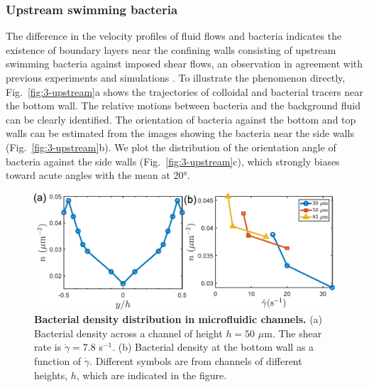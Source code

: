 \subsubsection{Upstream swimming bacteria}
The difference in the velocity profiles of fluid flows and bacteria indicates the existence of boundary layers near the confining walls consisting of upstream swimming bacteria against imposed shear flows, an observation in agreement with previous experiments \cite{Hill2007, Kaya2012} and simulations \cite{Costanzo2012, Chilukuri2014, Ezhilan2015, Nash2010}. To illustrate the phenomenon directly, Fig.~\ref{fig:3-upstream}a shows the trajectories of colloidal and bacterial tracers near the bottom wall. The relative motions between bacteria and the background fluid can be
clearly identified. The orientation of bacteria against the bottom and top walls can be estimated from the images showing the bacteria near the side walls (Fig.~\ref{fig:3-upstream}b). We plot the distribution of the orientation angle of bacteria against the side walls (Fig.~\ref{fig:3-upstream}c), which strongly biases toward acute angles with the mean at 20°.

\begin{figure}[!ht]
	\begin{center}
	\includegraphics[width=5.5 in]{Figs/3-Rheo/5.pdf}
	\end{center}
	\caption[Bacterial density distribution in microfluidic channels]
	{
	\textbf{Bacterial density distribution in microfluidic channels.}
   (a) Bacterial density across a channel of height $h = 50$ $\mu$m. The shear rate is $\dot\gamma = 7.8$ s$^{-1}$. (b) Bacterial density at the bottom wall as a function of $\dot\gamma$. Different symbols are from channels of different heights, $h$, which are indicated in the figure.
	}
	\label{fig:3-density}
\end{figure}

